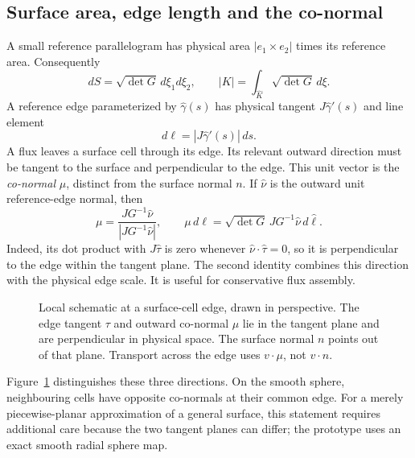 \subsection{Surface area, edge length and the co-normal}
A small reference parallelogram has physical area
$|e_1\times e_2|$ times its reference area. Consequently
\begin{equation}
 dS=\sqrt{\det G}\,d\xi_1d\xi_2,\qquad
 |K|=\int_{\widehat K}\sqrt{\det G}\,d\xi.
\end{equation}
A reference edge parameterized by $\widehat\gamma(s)$ has physical tangent
$J\widehat\gamma'(s)$ and line element
\begin{equation}
 d\ell=|J\widehat\gamma'(s)|\,ds.
\end{equation}
A flux leaves a surface cell through its edge. Its relevant outward direction
must be tangent to the surface and perpendicular to the edge. This unit
vector is the \emph{co-normal} $\mu$, distinct from the surface normal $n$.
If $\widehat\nu$ is the outward unit reference-edge normal, then
\begin{equation}
 \mu=\frac{J G^{-1}\widehat\nu}
              {|J G^{-1}\widehat\nu|},\qquad
 \mu\,d\ell=\sqrt{\det G}\,J G^{-1}\widehat\nu\,d\widehat\ell.
 \label{eq:app-conormal}
\end{equation}
Indeed, its dot product with $J\widehat\tau$ is zero whenever
$\widehat\nu\cdot\widehat\tau=0$, so it is perpendicular to the edge
within the tangent plane. The second identity combines this direction with
the physical edge scale. It is useful for conservative flux assembly.
\begin{figure}[tbp]
 \centering
 \caption{Local schematic at a surface-cell edge, drawn in perspective.
 The edge tangent $\tau$ and outward co-normal $\mu$ lie in the tangent
 plane and are perpendicular in physical space. The surface normal $n$
 points out of that plane. Transport across the edge uses $v\cdot\mu$,
 not $v\cdot n$.}
 \label{fig:appendix-conormal}
\end{figure}
Figure~\ref{fig:appendix-conormal} distinguishes these three directions.
On the smooth sphere, neighbouring cells have opposite co-normals at their
common edge. For a merely piecewise-planar approximation of a general
surface, this statement requires additional care because the two tangent
planes can differ; the prototype uses an exact smooth radial sphere map.

